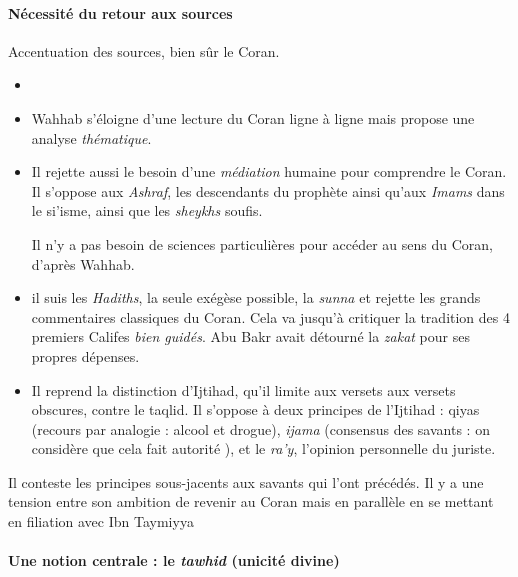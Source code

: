   \paragraph{Nécessité du retour aux sources} Accentuation des sources, bien sûr le Coran. 
  \begin{itemize}
      \item  \item  Wahhab s'éloigne d'une lecture du Coran ligne à ligne mais propose une analyse \textit{thématique}.
  \item Il rejette aussi le besoin d'une \textit{médiation} humaine pour comprendre le Coran. Il s'oppose aux \emph{Ashraf}, les descendants du prophète  ainsi qu'aux \emph{Imams} dans le si'isme, ainsi que les \emph{sheykhs} soufis.
  \begin{Prop}
  Il n'y a pas besoin de sciences particulières pour accéder au sens du Coran, d'après Wahhab. 
  \end{Prop}
  \item il suis les \emph{Hadiths}, la seule exégèse possible, la \textit{sunna} et rejette les grands commentaires classiques du Coran.  Cela va jusqu'à critiquer la tradition des 4 premiers Califes \textit{bien guidés}. Abu Bakr avait détourné la \textit{zakat} pour ses propres dépenses.
  \item Il reprend la distinction d'Ijtihad, qu'il limite aux versets aux versets obscures, contre le taqlid. Il s'oppose à deux principes de l'Ijtihad : qiyas (recours par analogie : alcool et drogue), \textit{ijama} (consensus des savants : on considère que cela fait autorité ), et le \textit{ra'y}, l'opinion personnelle du juriste. 
  
  \end{itemize}
 
 \begin{Prop}
 Il conteste les principes sous-jacents aux savants qui l'ont précédés. Il y a une tension entre son ambition de revenir au Coran mais en parallèle en se mettant en filiation avec Ibn Taymiyya
 \end{Prop}
 
 
  \paragraph{Une notion centrale : le \emph{tawhid} (unicité divine)}
  


